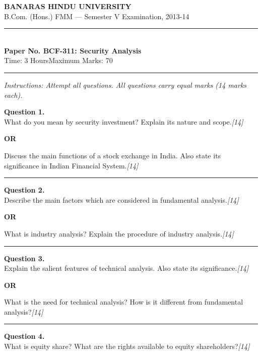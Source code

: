 \documentclass[11pt,a4paper]{article}
\newcommand{\pts}[1]{\hfill   \textit{[#1]}}
\begin{document}
\begin{center}
  {\large\bfseries BANARAS HINDU UNIVERSITY}\\[2pt]
  {\normalsize B.Com. (Hons.) FMM --- Semester V Examination, 2013-14}\\[6pt]
  \rule{0.8\linewidth}{0.5pt}\\[6pt]
  {\large\bfseries Paper No. BCF-311: Security Analysis}\\[4pt]
  {\normalsize Time: 3 Hours\hfill Maximum Marks: 70}
\end{center}

\rule{\linewidth}{0.4pt}

\smallskip



\noindent   \textit{Instructions: Attempt all questions. All questions carry equal marks (14 marks each).}

\bigskip




\noindent   \textbf{Question 1.} \\
What do you mean by security investment? Explain its nature and scope.\pts{14}

\centerline{   \textbf{OR}}

Discuss the main functions of a stock exchange in India. Also state its significance in Indian Financial System.\pts{14}

\medskip\rule{\linewidth}{0.2pt}




\noindent   \textbf{Question 2.} \\
Describe the main factors which are considered in fundamental analysis.\pts{14}

\centerline{   \textbf{OR}}

What is industry analysis? Explain the procedure of industry analysis.\pts{14}

\medskip\rule{\linewidth}{0.2pt}




\noindent   \textbf{Question 3.} \\
Explain the salient features of technical analysis. Also state its significance.\pts{14}

\centerline{   \textbf{OR}}

What is the need for technical analysis? How is it different from fundamental analysis?\pts{14}

\medskip\rule{\linewidth}{0.2pt}




\noindent   \textbf{Question 4.} \\
What is equity share? What are the rights available to equity shareholders?\pts{14}
\end{document}
